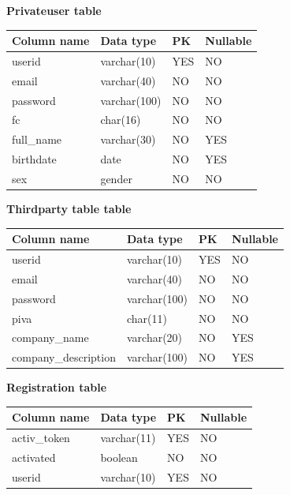 \documentclass[titlepage]{article}
\begin{document}
	{\bf Privateuser table} 
	\renewcommand*{\arraystretch}{1.4}
	\begin{longtable}{| p{3 cm} | p{2 cm} | p{2 cm} | p{2 cm} |} \hline
		Column name & Data type & PK & Nullable \\ \hline
		userid & varchar(10) & YES & NO \\ \hline
		email & varchar(40) & NO & NO \\ \hline
		password & varchar(100) & NO & NO \\ \hline
		fc & char(16) & NO & NO \\ \hline
		full\_name & varchar(30) & NO & YES \\ \hline
		birthdate & date & NO & YES \\ \hline
		sex & gender & NO & NO \\ \hline
	\end{longtable}
	
	\vspace{\baselineskip}
	\vspace{\baselineskip}
	
	{\bf Thirdparty table table} 
	\renewcommand*{\arraystretch}{1.4}
	\begin{longtable}{| p{3 cm} | p{2 cm} | p{2 cm} | p{2 cm} |} \hline
		Column name & Data type & PK & Nullable \\ \hline
		userid & varchar(10) & YES & NO \\ \hline
		email & varchar(40) & NO & NO \\ \hline
		password & varchar(100) & NO & NO \\ \hline
		piva & char(11) & NO & NO \\ \hline
		company\_name & varchar(20) & NO & YES \\ \hline
		company\_description & varchar(100) & NO & YES \\ \hline
	\end{longtable}
	
	\vspace{\baselineskip}
	\vspace{\baselineskip}
	
	{\bf Registration table} 
	\renewcommand*{\arraystretch}{1.4}
	\begin{longtable}{| p{3 cm} | p{2 cm} | p{2 cm} | p{2 cm} |} \hline
		Column name & Data type & PK & Nullable \\ \hline
		activ\_token & varchar(11) & YES & NO \\ \hline
		activated & boolean & NO & NO \\ \hline
		userid & varchar(10) & YES & NO \\ \hline
	\end{longtable}
	
\end{document}
